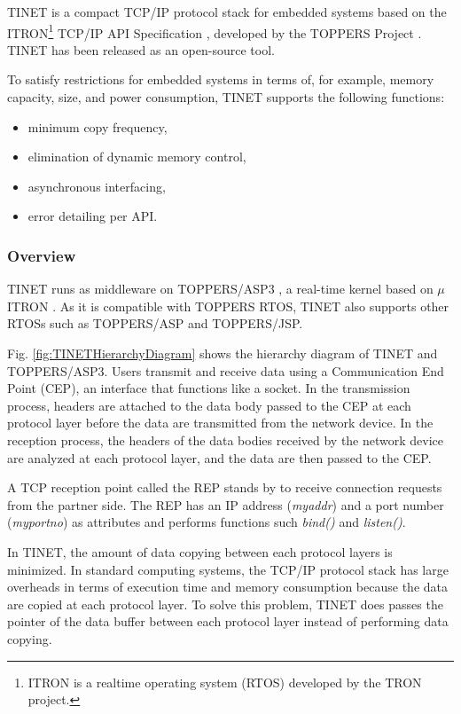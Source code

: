 \documentclass[conference]{IEEEtran/IEEEtran}
\begin{document}
TINET is a compact TCP/IP protocol stack for embedded systems based on the ITRON\footnote{ITRON is a realtime operating system (RTOS) developed by the TRON project.} TCP/IP API Specification \cite{url:ITRON_TCP/IP_API_Spec}, developed by the TOPPERS Project \cite{url:TOPPERS}.
TINET has been released as an open-source tool.

To satisfy restrictions for embedded systems in terms of, for example, memory capacity, size, and power consumption, TINET supports the following functions:

\begin{itemize}
    \item minimum copy frequency,
    \item elimination of dynamic memory control,
    \item asynchronous interfacing,
    \item error detailing per API.
\end{itemize}

\subsubsection{Overview}

TINET runs as middleware on TOPPERS/ASP3 \cite{par:ASP3} \cite{url:ASP3}, a real-time kernel based on $\mu$ITRON \cite{par:microITRON}.
As it is compatible with TOPPERS RTOS, TINET also supports other RTOSs such as TOPPERS/ASP and TOPPERS/JSP.

Fig. \ref{fig:TINETHierarchyDiagram} shows the hierarchy diagram of TINET and TOPPERS/ASP3.
Users transmit and receive data using a Communication End Point (CEP), an interface that functions like a socket.
In the transmission process, headers are attached to the data body passed to the CEP at each protocol layer before the data are transmitted from the network device.
In the reception process, the headers of the data bodies received by the network device are analyzed at each protocol layer, and the data are then passed to the CEP.

A TCP reception point called the REP stands by to receive connection requests from the partner side.
The REP has an IP address ({\it myaddr}) and a port number ({\it myportno}) as attributes and performs functions such {\it bind()} and {\it listen()}.

In TINET, the amount of data copying between each protocol layers is minimized.
In standard computing systems, the TCP/IP protocol stack has large overheads in terms of execution time and memory consumption because the data are copied at each protocol layer.
To solve this problem, TINET does passes the pointer of the data buffer between each protocol layer instead of performing data copying.
\end{document}
